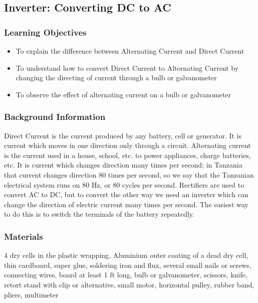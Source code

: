 \subsection{Inverter: Converting DC to AC}

\subsubsection*{Learning Objectives}
\begin{itemize}
\item{To explain the difference between Alternating Current and Direct Current} 
\item{To understand how to convert Direct Current to Alternating Current by changing the directing of current through a bulb or galvanometer} 
\item{To observe the effect of alternating current on a bulb or galvanometer} 
\end{itemize}

\subsubsection*{Background Information}
Direct Current is the current produced by any battery, cell or generator. It is current which moves in one direction only through a circuit. Alternating current is the current used in a house, school, etc. to power appliances, charge batteries, etc. It is current which changes direction many times per second; in Tanzania that current changes direction 80 times per second, so we say that the Tanzanian electrical system runs on 80 Hz, or 80 cycles per second.  
Rectifiers are used to convert AC to DC, but to convert the other way we need an inverter which can change the direction of electric current many times per second. The easiest way to do this is to switch the terminals of the battery repeatedly.  

\subsubsection*{Materials}
4 dry cells in the plastic wrapping, Aluminium outer coating of a dead dry cell, thin cardboard, super glue, soldering iron and flux, several small nails or screws, connecting wires, board at least 1 ft long, bulb or galvanometer, scissors, knife, retort stand with clip or alternative, small motor, horizontal pulley, rubber band, pliers, multimeter


